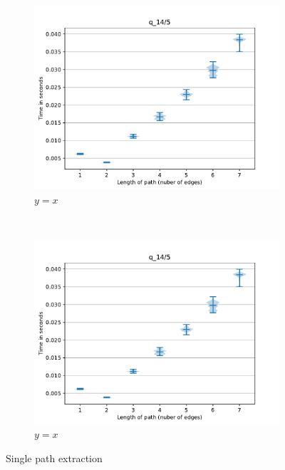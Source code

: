 \begin{figure}
     \begin{subfigure}[b]{0.24\textwidth}
         \centering
         \includegraphics[width=\textwidth]{data/res_graphics/q_14_5.pdf}
         \caption{$y=x$}
         \label{fig:y equals x}
     \end{subfigure}
     ~\begin{subfigure}[b]{0.24\textwidth}
         \centering
         \includegraphics[width=\textwidth]{data/res_graphics/q_14_5.pdf}
         \caption{$y=x$}
         \label{fig:y equals x}
     \end{subfigure}
   \caption{Single path extraction}
\end{figure}

